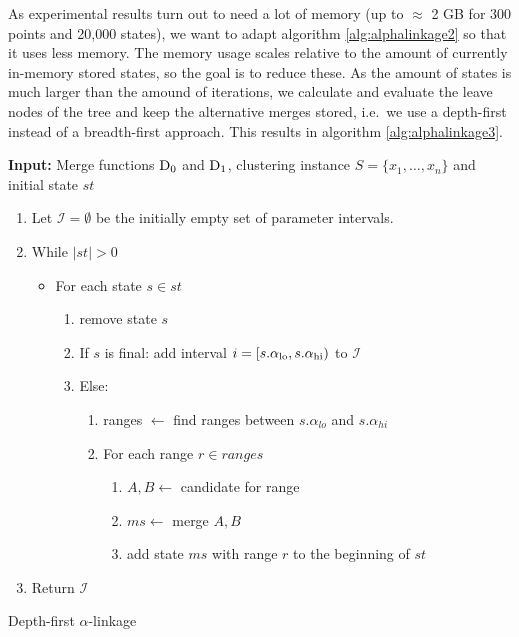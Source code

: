 As experimental results turn out to need a lot of memory (up to $\approx$ 2 GB for 300 points and 20,000 states), we want to adapt algorithm \ref{alg:alphalinkage2} so that it uses less memory. The memory usage scales relative to the amount of currently in-memory stored states, so the goal is to reduce these. As the amount of states is much larger than the amound of iterations, we calculate and evaluate the leave nodes of the tree and keep the alternative merges stored, i.e.\ we use a depth-first instead of a breadth-first approach. This results in algorithm \ref{alg:alphalinkage3}.

\begin{algorithm}
    \textbf{Input:} Merge functions $\operatorname{D_{0}}$ and $\operatorname{D_{1}}$, clustering instance $S = \{x_1, \dots, x_n\}$ and initial state $st$
    \begin{enumerate}[nosep, leftmargin=*]
    \item Let $\mathcal{I} = \emptyset$ be the initially empty set of parameter intervals.
    \item While $|st| > 0$
    \begin{itemize}[nosep, leftmargin=*]
        \item For each state $s \in st$
        \begin{enumerate}
            \item remove state $s$\;
            \item If $s$ is final: add interval $i = [s.\alpha_\text{lo}, s.\alpha_\text{hi})$ to $\mathcal{I}$
            \item Else: 
            \begin{enumerate}
                \item ranges $\gets$ find ranges between $s.\alpha_{lo}$ and $s.\alpha_{hi}$
                \item For each range $r \in ranges$
                \begin{enumerate}
                    \item $A, B \gets$ candidate for range
                    \item $ms \gets$ merge $A, B$
                    \item add state $ms$ with range $r$ to the beginning of $st$
                \end{enumerate}
            \end{enumerate}
        \end{enumerate}
    \end{itemize}
    \item Return $\mathcal{I}$
    \end{enumerate}
    \caption{Depth-first $\alpha$-linkage}
    \label{alg:alphalinkage3}
\end{algorithm}

